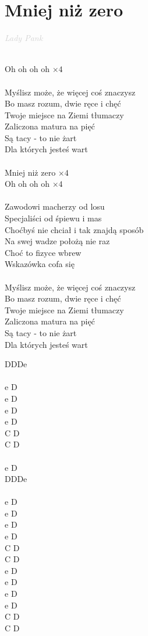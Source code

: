\documentclass[a5paper, 10pt]{book}
\begin{document}
\section{Mniej niż zero}\textcolor{lightgray}{\textit{Lady Pank}}\\~\\
\begin{minipage}[t]{0.8\textwidth}
Oh oh oh oh $\times 4$\\
\\
Myślisz może, że więcej coś znaczysz\\
Bo masz rozum, dwie ręce i chęć\\
Twoje miejsce na Ziemi tłumaczy\\
Zaliczona matura na pięć\\
Są tacy - to nie żart\\
Dla których jesteś wart\\
\\
Mniej niż zero $\times 4$\\
Oh oh oh oh $\times 4$\\
\\
Zawodowi macherzy od losu\\
Specjaliści od śpiewu i mas\\
Choćbyś nie chciał i tak znajdą sposób\\
Na swej wadze położą nie raz\\
Choć to fizyce wbrew\\
Wskazówka cofa się\\
\\
Myślisz może, że więcej coś znaczysz\\
Bo masz rozum, dwie ręce i chęć\\
Twoje miejsce na Ziemi tłumaczy\\
Zaliczona matura na pięć\\
Są tacy - to nie żart\\
Dla których jesteś wart\\
\end{minipage}
\begin{minipage}[t]{0.2\textwidth}
DDDe\\~\\e D\\e D\\e D\\e D\\C D\\C D\\
~\\e D\\
DDDe\\~\\
e D\\e D\\e D\\e D\\C D\\C D\\

e D\\e D\\e D\\e D\\C D\\C D\\
\end{minipage}
\end{document}
